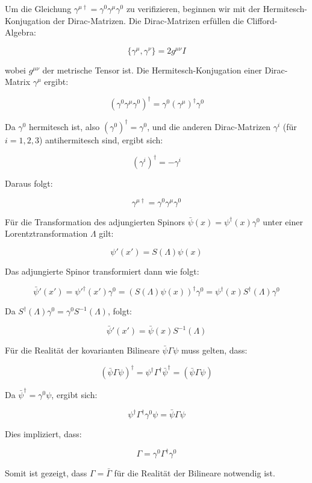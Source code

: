 Um die Gleichung \(\gamma^{\mu \dagger} = \gamma^0 \gamma^\mu \gamma^0\) zu verifizieren, beginnen wir mit der Hermitesch-Konjugation der Dirac-Matrizen. Die Dirac-Matrizen erfüllen die Clifford-Algebra:

\[
\{\gamma^\mu, \gamma^\nu\} = 2g^{\mu\nu}I
\]

wobei \(g^{\mu\nu}\) der metrische Tensor ist. Die Hermitesch-Konjugation einer Dirac-Matrix \(\gamma^\mu\) ergibt:

\[
(\gamma^0 \gamma^\mu \gamma^0)^\dagger = \gamma^0 (\gamma^\mu)^\dagger \gamma^0
\]

Da \(\gamma^0\) hermitesch ist, also \((\gamma^0)^\dagger = \gamma^0\), und die anderen Dirac-Matrizen \(\gamma^i\) (für \(i = 1, 2, 3\)) antihermitesch sind, ergibt sich:

\[
(\gamma^i)^\dagger = -\gamma^i
\]

Daraus folgt:

\[
\gamma^{\mu \dagger} = \gamma^0 \gamma^\mu \gamma^0
\]

Für die Transformation des adjungierten Spinors \(\bar{\psi}(x) = \psi^\dagger(x) \gamma^0\) unter einer Lorentztransformation \(\Lambda\) gilt:

\[
\psi'(x') = S(\Lambda) \psi(x)
\]

Das adjungierte Spinor transformiert dann wie folgt:

\[
\bar{\psi}'(x') = \psi'^\dagger(x') \gamma^0 = \left(S(\Lambda) \psi(x)\right)^\dagger \gamma^0 = \psi^\dagger(x) S^\dagger(\Lambda) \gamma^0
\]

Da \(S^\dagger(\Lambda) \gamma^0 = \gamma^0 S^{-1}(\Lambda)\), folgt:

\[
\bar{\psi}'(x') = \bar{\psi}(x) S^{-1}(\Lambda)
\]

Für die Realität der kovarianten Bilineare \(\bar{\psi} \Gamma \psi\) muss gelten, dass:

\[
(\bar{\psi} \Gamma \psi)^\dagger = \psi^\dagger \Gamma^\dagger \bar{\psi}^\dagger = (\bar{\psi} \Gamma \psi)
\]

Da \(\bar{\psi}^\dagger = \gamma^0 \psi\), ergibt sich:

\[
\psi^\dagger \Gamma^\dagger \gamma^0 \psi = \bar{\psi} \Gamma \psi
\]

Dies impliziert, dass:

\[
\Gamma = \gamma^0 \Gamma^\dagger \gamma^0
\]

Somit ist gezeigt, dass \(\Gamma = \bar{\Gamma}\) für die Realität der Bilineare notwendig ist.

